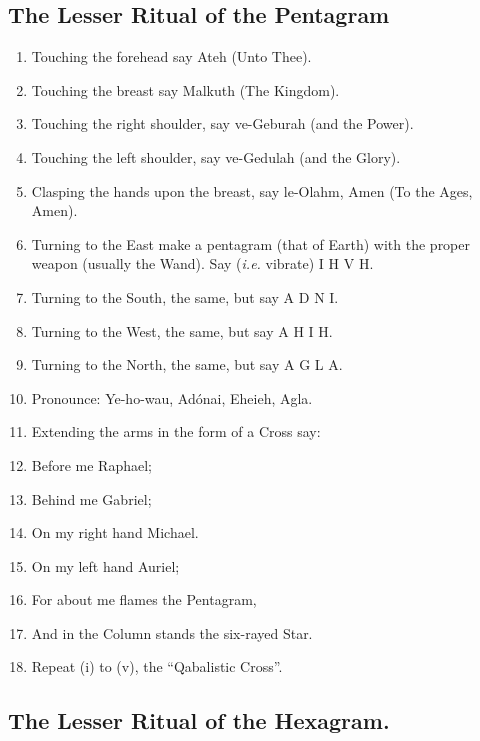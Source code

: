 \subsection*{The Lesser Ritual of the Pentagram}
\begin{enumerate}[label=(\Roman*)]
\item Touching the forehead say Ateh (Unto Thee).
\item Touching the breast say Malkuth (The Kingdom).
\item Touching the right shoulder, say ve-Geburah (and the Power).
\item Touching the left shoulder, say ve-Gedulah (and the Glory).
\item Clasping the hands upon the breast, say le-Olahm, Amen (To the Ages, Amen).
\item Turning to the East make a pentagram (that of Earth) with the proper weapon (usually the Wand). Say (\textit{i.e.} vibrate) \linebreak[2] I H V H.
\item Turning to the South, the same, but say \linebreak[2] A D N I.
\item Turning to the West, the same, but say \linebreak[2] A H I H.
\item Turning to the North, the same, but say \linebreak[2] A G L A.
\item[] Pronounce: Ye-ho-wau, Ad\'{o}nai, Eheieh, Agla.
\item Extending the arms in the form of a Cross say:
\item Before me Raphael;
\item Behind me Gabriel;
\item On my right hand Michael.
\item On my left hand Auriel;
\item For about me flames the Pentagram,
\item And in the Column stands the six-rayed Star.
\item[] Repeat (i) to (v), the \enquote{Qabalistic Cross}.
\end{enumerate}

\subsection*{The Lesser Ritual of the Hexagram.}


